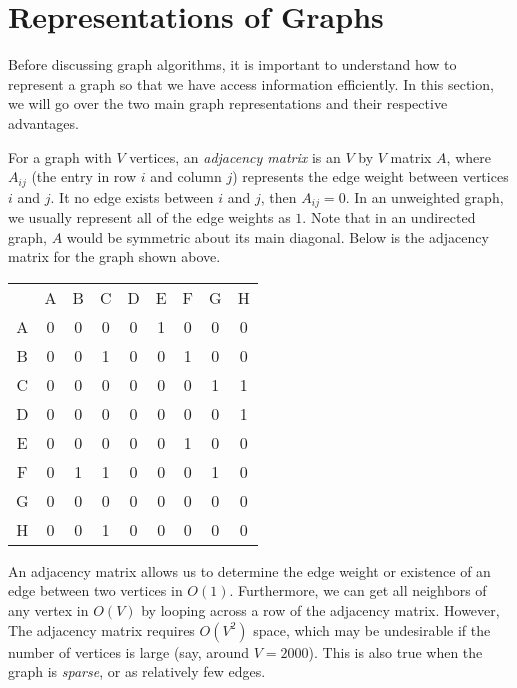 \section{Representations of Graphs}

Before discussing graph algorithms, it is important to understand how to represent a graph so that we have access information efficiently. In this section, we will go over the two main graph representations and their respective advantages.

For a graph with $V$ vertices, an \textit{adjacency matrix} is an $V$ by $V$ matrix $A$, where $A_{ij}$ (the entry in row $i$ and column $j$) represents the edge weight between vertices $i$ and $j$. It no edge exists between $i$ and $j$, then $A_{ij} = 0$. In an unweighted graph, we usually represent all of the edge weights as $1$. Note that in an undirected graph, $A$ would be symmetric about its main diagonal. Below is the adjacency matrix for the graph shown above. 

\begin{center}
\begin{minipage}{0.45\linewidth}
\begin{tabular}{c c c c c c c c c}
         & A & B & C & D & E & F & G & H \\
A        & 0 & 0 & 0 & 0 & 1 & 0 & 0 & 0 \\
B        & 0 & 0 & 1 & 0 & 0 & 1 & 0 & 0 \\
C        & 0 & 0 & 0 & 0 & 0 & 0 & 1 & 1 \\
D        & 0 & 0 & 0 & 0 & 0 & 0 & 0 & 1 \\
E        & 0 & 0 & 0 & 0 & 0 & 1 & 0 & 0 \\
F        & 0 & 1 & 1 & 0 & 0 & 0 & 1 & 0 \\
G        & 0 & 0 & 0 & 0 & 0 & 0 & 0 & 0 \\
H        & 0 & 0 & 1 & 0 & 0 & 0 & 0 & 0 \\
\end{tabular}
\end{minipage}
\end{center}

An adjacency matrix allows us to determine the edge weight or existence of an edge between two vertices in $O(1)$. Furthermore, we can get all neighbors of any vertex in $O(V)$ by looping across a row of the adjacency matrix. However, The adjacency matrix requires $O(V^2)$ space, which may be undesirable if the number of vertices is large (say, around $V = 2000$). This is also true when the graph is \textit{sparse}, or as relatively few edges. 

